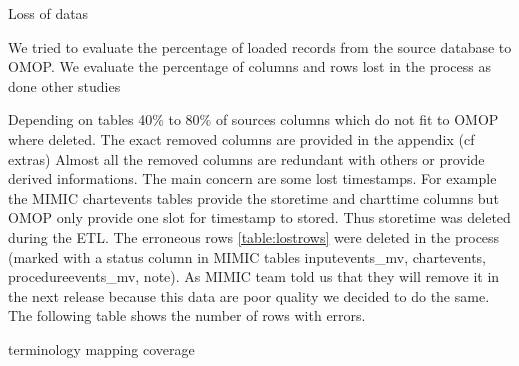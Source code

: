 Loss of datas

We tried to evaluate the percentage of loaded records from the source database
to OMOP. We evaluate the percentage of columns and rows lost in the process as
done other studies \cite{omop-nashville}

Depending on tables 40\% to 80\% of sources columns which do not fit to OMOP
where deleted.  The exact removed columns are provided in the appendix (cf
extras) Almost all the removed columns are redundant with others or provide
derived informations.  The main concern are some lost timestamps. For example
the MIMIC chartevents tables provide the storetime and charttime columns but
OMOP only provide one slot for timestamp to stored. Thus storetime was deleted
during the ETL.
The erroneous rows \ref{table:lostrows} were deleted in the process (marked
with a status column in MIMIC tables inputevents\_mv, chartevents,
procedureevents\_mv, note). As MIMIC team told us that they will remove it in
the next release because this data are poor quality we decided to do the same. 
The following table shows the number of rows with errors.

\begin{table*}[t]
\label{table:lostrows}
\end{table*}

terminology mapping coverage

